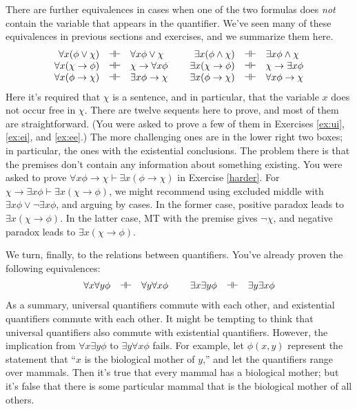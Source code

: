 There are further equivalences in cases when one of the two formulas
does {\it not} contain the variable that appears in the quantifier.
We've seen many of these equivalences in previous sections and
exercises, and we summarize them here.  
\[ \begin{array}{ r c l p{0.1cm} r c l} \forall x(\phi\vee \chi ) & \dashv\vdash & 
    \forall x\phi \vee \chi & & \exists x(\phi \wedge \chi ) &\dashv\vdash & \exists
    x\phi\wedge \chi \\ \forall x(\chi \to \phi )& \dashv\vdash & \chi\to \forall
    x\phi & & \exists x(\chi \to \phi ) & \dashv\vdash & \chi\to \exists x\phi \\ 
    \forall x(\phi\to \chi ) & \dashv\vdash & \exists x\phi\to \chi & &  \exists x(\phi\to
    \chi ) & \dashv\vdash & \forall x\phi\to \chi  \end{array} \] Here it's required
that $\chi$ is a sentence, and in particular, that the variable $x$ does not
occur free in $\chi$.  There are
twelve sequents here to prove, and most of them are straightforward.
(You were asked to prove a few of them in Exercises \ref{ex:ui},
\ref{ex:ei}, and \ref{ex:ee}.)  The more challenging ones are in the
lower right two boxes; in particular, the ones with the existential
conclusions.  The problem there is that the premises don't contain any
information about something existing.  You were asked to prove
$\forall x\phi\to \chi\vdash\exists x(\phi\to \chi )$ in Exercise \ref{harder}.
For $\chi\to \exists x\phi\vdash\exists x(\chi\to \phi )$, we might recommend
using excluded middle with $\exists x\phi \vee \neg\exists x\phi$, and
arguing by cases.  In the former case, positive paradox leads to
$\exists x(\chi\to \phi )$.  In the latter case, MT with the premise gives
$\neg \chi$, and negative paradox leads to $\exists x(\chi\to \phi )$.

We turn, finally, to the relations between quantifiers.  You've
already proven the following equivalences:
\[ \begin{array}{r c l p{0.1cm} r c l}
     \forall x\forall y\phi  & \dashv\vdash & \forall y\forall x\phi
                                              & & \exists x\exists y\phi  & \dashv\vdash & \exists y\exists x\phi
                                              \end{array} \]
As a summary, universal quantifiers commute with each other, and
existential quantifiers commute with each other.  It might be tempting
to think that universal quantifiers also commute with existential
quantifiers.  However, the implication from $\forall x\exists y\phi
$ to $\exists y\forall x\phi$ fails.  For example, let
$\phi (x,y)$ represent the statement that ``$x$ is the biological mother
of $y$,'' and let the quantifiers range over mammals.
Then it's true that every mammal has a biological mother; but it's
false that there is some particular mammal that is the biological
mother of all others.   


